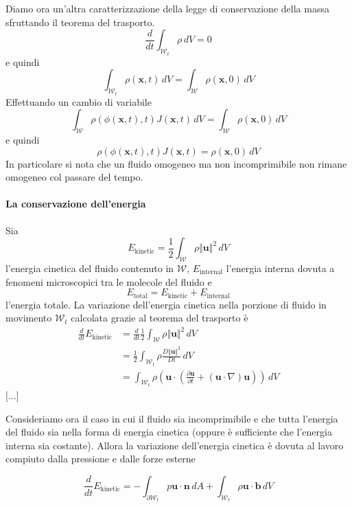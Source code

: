 \documentclass{book}
\begin{document}
Diamo ora un'altra caratterizzazione della legge di conservazione della massa sfruttando il teorema del trasporto.
$$\frac{d}{dt}\int_{\mathcal{W}_t}\rho\,dV=0$$
e quindi
$$\int_{\mathcal{W}_t}\rho(\mathbf{x},t)\,dV=\int_\mathcal{W}\rho(\mathbf{x},0)\,dV$$
Effettuando un cambio di variabile
$$\int_{\mathcal{W}}\rho(\phi(\mathbf{x},t),t)J(\mathbf{x},t)\,dV=\int_\mathcal{W}\rho(\mathbf{x},0)\,dV$$
e quindi
\begin{equation}
  \boxed{
  \rho(\phi(\mathbf{x},t),t)J(\mathbf{x},t)=\rho(\mathbf{x},0)\,dV
  }
\end{equation}
In particolare si nota che un fluido omogeneo ma non incomprimibile non rimane omogeneo col passare del tempo.

\paragraph{La conservazione dell'energia}
Sia $$E_{\text{kinetic}} = \frac{1}{2} \int_{\mathcal{W}} \rho \Vert \mathbf{u} \Vert^2 \, dV$$ l'energia cinetica del fluido contenuto in $\mathcal{W}$, $E_{\text{internal}}$ l'energia interna dovuta a fenomeni microscopici tra le molecole del fluido e $$E_{\text{total}}=E_{\text{kinetic}}+E_{\text{internal}}$$ l'energia totale.
La variazione dell'energia cinetica nella porzione di fluido in movimento $\mathcal{W}_t$ calcolata grazie al teorema del trasporto è 
\begin{equation}
\begin{split}
\frac{d}{dt} E_{\text{kinetic}} &= \frac{d}{dt} \frac{1}{2} \int_{\mathcal{W}} \rho \Vert \mathbf{u} \Vert^2 \, dV \\
                                &= \frac{1}{2}  \int_{\mathcal{W}_t} \rho \frac{D\Vert \mathbf{u} \Vert^2}{Dt} \, dV \\
                                &=  \int_{\mathcal{W}_t} \rho ( \mathbf{u} \cdot ( \frac{\partial \mathbf{u}}{\partial t} + (\mathbf{u} \cdot \nabla) \mathbf{u} )) \, dV
\end{split}
\end{equation}
[...]

Consideriamo ora il caso in cui il fluido sia incomprimibile e che tutta l'energia del fluido sia nella forma di energia cinetica (oppure è sufficiente che l'energia interna sia costante). Allora la variazione dell'energia cinetica è dovuta al lavoro compiuto dalla pressione e dalle forze esterne

$$\frac{d}{dt} E_{\text{kinetic}} = - \int_{\partial \mathcal{W}_t} p \mathbf{u} \cdot \mathbf{n} \, dA + \int_{\mathcal{W}_t} \rho \mathbf{u} \cdot \mathbf{b} \, dV $$
\end{document}
